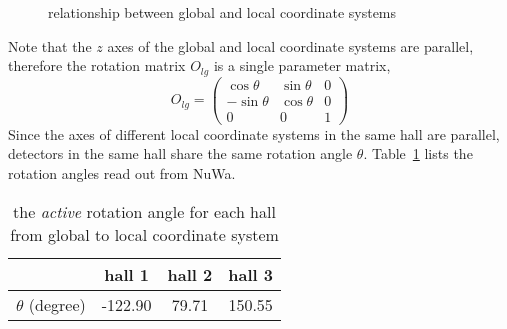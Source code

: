 \documentclass[letterpaper, 11pt]{scrartcl} %
\numberwithin{equation}{section} %
\numberwithin{figure}{section} %
\numberwithin{table}{section} %
\begin{document}
\begin{figure}
\centering
{}
\caption{relationship between global and local coordinate systems} \label{fig:Fig1}
\end{figure}

Note that the $z$ axes of the global and local coordinate systems are parallel, therefore the rotation matrix $O_{lg}$ is a single parameter matrix,
\begin{equation}
	O_{lg}=
	\begin{pmatrix}
	\cos\theta & \sin\theta & 0 \\
  -\sin\theta & \cos\theta & 0  \\
  0 & 0  & 1
	\end{pmatrix}
\end{equation}
Since the axes of different local coordinate systems in the same hall are parallel, detectors in the same hall share the same rotation angle $\theta$. Table~\ref{table:rotationangle} lists the rotation angles read out from NuWa.

\begin{table}
	\centering
	\begin{tabular}{|c|c|c|c|}
		\hline
		& hall 1 & hall 2 & hall 3 \\
		\hline
		$\theta$ (degree) & -122.90 & 79.71 & 150.55 \\
		\hline
	\end{tabular}
	\caption{the \emph{active} rotation angle for each hall from global to local coordinate system}
	\label{table:rotationangle}
\end{table}
\end{document}
